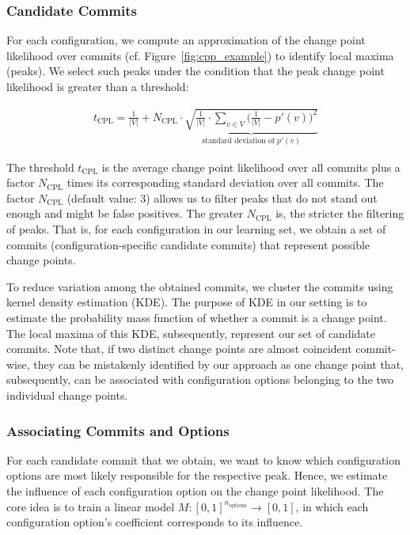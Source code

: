 \documentclass[sigconf]{acmart}
\begin{document}
	\subsubsection{Candidate Commits}
	For each configuration, we compute an approximation of the change point likelihood over commits (cf. Figure~\ref{fig:cpp_example}) to identify local maxima (peaks). We select such peaks under the condition that the peak change point likelihood is greater than a threshold:
	{\color{red}\begin{equation}
	\begin{gathered}
	t_\text{CPL} = \frac{1}{\vert V\vert} + N_\text{CPL} \cdot \underbrace{\sqrt{\frac{1}{\vert V\vert} \cdot \sum_{v \in V} \Big(\frac{1}{\vert V\vert} - p'(v)\Big)^2}}_{\text{standard deviation of }p'(v)}
	\label{eq:t_cpl}
	\end{gathered}
	\end{equation}
	
	The threshold $t_\text{CPL}$ is the average change point likelihood over all commits plus a factor $N_\text{CPL}$ times its corresponding standard deviation over all commits. 
	The factor $N_\text{CPL}$ (default value: 3) allows us to filter peaks that do not stand out enough and might be false positives. The greater $N_\text{CPL}$ is, the stricter the filtering of peaks. That is, for each configuration in our learning set, we obtain a set of commits (configuration-specific candidate commits) that represent possible change points.
	}To reduce variation among the obtained commits, we cluster the commits using kernel density estimation (KDE). The purpose of KDE in our setting is to estimate the probability mass function of whether a commit is a change point. The local maxima of this KDE, subsequently, represent our set of candidate commits. Note that, if two distinct change points are almost coincident commit-wise, they can be mistakenly identified by our approach as one change point that, subsequently, can be associated with configuration options belonging to the two individual change points.
	
	\subsubsection{Associating Commits and Options}
	For each candidate commit that we obtain, we want to know which configuration options are most likely responsible for the respective peak. Hence, we estimate the influence  of each configuration option on the change point likelihood. The core idea is to train a linear model $M: [0,1]^{n_{\text{options}}} \rightarrow [0,1]$, in which each configuration option's coefficient corresponds to its influence. 
	
\end{document}
